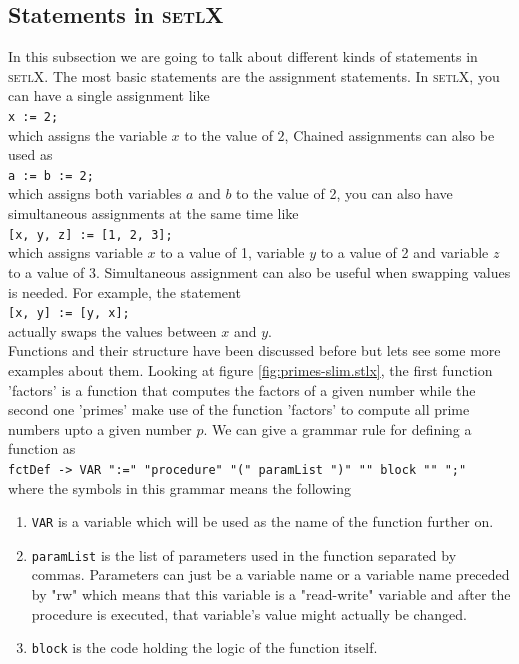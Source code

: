 \documentclass[11pt]{article}
\begin{document}
\subsection{Statements in \textsc{setlX}}
In this subsection we are going to talk about different kinds of statements in \textsc{setlX}. The most basic statements are the assignment statements. In \textsc{setlX}, you can have a single assignment like
\\[0.2cm]
\hspace*{1.3cm}
\texttt{x := 2;}
\\[0.2cm]
which assigns the variable $x$ to the value of $2$, Chained assignments can also be used as
\\[0.2cm]
\hspace*{1.3cm}
\texttt{a := b := 2;}
\\[0.2cm]
which assigns both variables $a$ and $b$ to the value of 2, you can also have simultaneous assignments at the same time like
\\[0.2cm]
\hspace*{1.3cm}
\texttt{[x, y, z] := [1, 2, 3];}
\\[0.2cm]
which assigns variable $x$ to a value of 1, variable $y$ to a value of 2 and variable $z$ to a value of 3. Simultaneous assignment can also be useful when swapping values is needed. For example, the statement
\\[0.2cm]
\hspace*{1.3cm}
\texttt{[x, y] := [y, x];}
\\[0.2cm]
actually swaps the values between $x$ and $y$.
\\

Functions and their structure have been discussed before but lets see some more examples about them. Looking at figure \ref{fig:primes-slim.stlx}, the first function 'factors' is a function that computes the factors of a given number while the second one 'primes' make use of the function 'factors' to compute all prime numbers upto a given number $p$. We can give a grammar rule for defining a function as
\\[0.2cm]
\hspace*{1.3cm}
\texttt{fctDef -> VAR ":=" "procedure" "(" paramList ")" "{" block "}" ";"}
\\[0.2cm]
where the symbols in this grammar means the following
\begin{enumerate}
\item \texttt{VAR} is a variable which will be used as the name of the function further on.
\item \texttt{paramList} is the list of parameters used in the function separated by commas. Parameters can just be a variable name or a variable name preceded by "rw" which means that this variable is a "read-write" variable and after the procedure is executed, that variable's value might actually be changed.
\item \texttt{block} is the code holding the logic of the function itself.
\end{enumerate}
\end{document}
